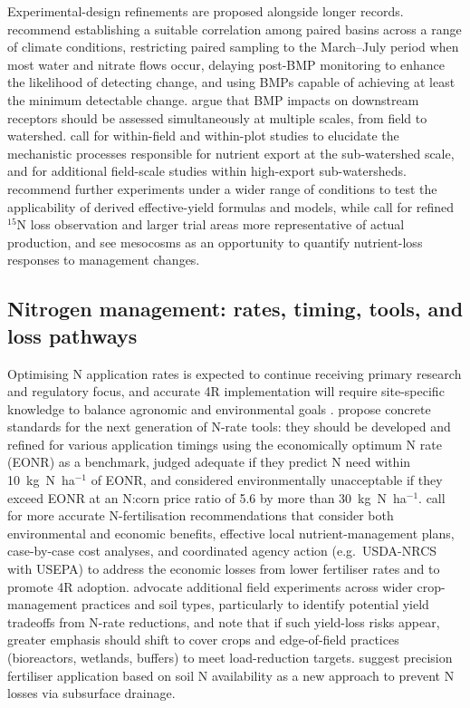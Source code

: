Experimental-design refinements are proposed alongside longer records. \textcite{Schilling2013} recommend establishing a suitable correlation among paired basins across a range of climate conditions, restricting paired sampling to the March--July period when most water and nitrate flows occur, delaying post-BMP monitoring to enhance the likelihood of detecting change, and using BMPs capable of achieving at least the minimum detectable change. \textcite{Sunohara2016} argue that BMP impacts on downstream receptors should be assessed simultaneously at multiple scales, from field to watershed. \textcite{Irvine2019} call for within-field and within-plot studies to elucidate the mechanistic processes responsible for nutrient export at the sub-watershed scale, and for additional field-scale studies within high-export sub-watersheds. \textcite{Xin2016c} recommend further experiments under a wider range of conditions to test the applicability of derived effective-yield formulas and models, while \textcite{Xiong2025} call for refined $^{15}$N loss observation and larger trial areas more representative of actual production, and \textcite{Loper2024} see mesocosms as an opportunity to quantify nutrient-loss responses to management changes.

\subsection{Nitrogen management: rates, timing, tools, and loss pathways}

Optimising N application rates is expected to continue receiving primary research and regulatory focus, and accurate 4R implementation will require site-specific knowledge to balance agronomic and environmental goals \parencite{Christianson2015b}. \textcite{Bandura2025} propose concrete standards for the next generation of N-rate tools: they should be developed and refined for various application timings using the economically optimum N rate (EONR) as a benchmark, judged adequate if they predict N need within 10~kg~N~ha$^{-1}$ of EONR, and considered environmentally unacceptable if they exceed EONR at an N:corn price ratio of 5.6 by more than 30~kg~N~ha$^{-1}$. \textcite{Liu2021} call for more accurate N-fertilisation recommendations that consider both environmental and economic benefits, effective local nutrient-management plans, case-by-case cost analyses, and coordinated agency action (e.g.\ USDA-NRCS with USEPA) to address the economic losses from lower fertiliser rates and to promote 4R adoption. \textcite{Banger2018} advocate additional field experiments across wider crop-management practices and soil types, particularly to identify potential yield tradeoffs from N-rate reductions, and note that if such yield-loss risks appear, greater emphasis should shift to cover crops and edge-of-field practices (bioreactors, wetlands, buffers) to meet load-reduction targets. \textcite{Gupta2023} suggest precision fertiliser application based on soil N availability as a new approach to prevent N losses via subsurface drainage.

